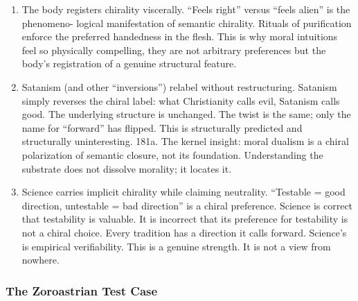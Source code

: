 \documentclass[
]{article}
\begin{document}
\begin{enumerate}
  Moral dualism is powerful but brittle. Freezing the helical flux into
  a fixed battlefield (one twist = good, mirror = evil) is energizing,
  it mobilizes commitment, clarifies choice, and generates heroic
  action. It is also brittle: it cannot accommodate the recognition that
  the mirror-image has its own structural validity. When the mirror is
  encountered (another tradition with opposite chirality), the only
  options are war or denial.
\item
  The body registers chirality viscerally. ``Feels right'' versus
  ``feels alien'' is the phenomeno- logical manifestation of semantic
  chirality. Rituals of purification enforce the preferred handedness in
  the flesh. This is why moral intuitions feel so physically compelling,
  they are not arbitrary preferences but the body's registration of a
  genuine structural feature.
\item
  Satanism (and other ``inversions'') relabel without restructuring.
  Satanism simply reverses the chiral label: what Christianity calls
  evil, Satanism calls good. The underlying structure is unchanged. The
  twist is the same; only the name for ``forward'' has flipped. This is
  structurally predicted and structurally uninteresting. 181a. The
  kernel insight: moral dualism is a chiral polarization of semantic
  closure, not its foundation. Understanding the substrate does not
  dissolve morality; it locates it.
\item
  Science carries implicit chirality while claiming neutrality.
  ``Testable = good direction, untestable = bad direction'' is a chiral
  preference. Science is correct that testability is valuable. It is
  incorrect that its preference for testability is not a chiral choice.
  Every tradition has a direction it calls forward. Science's is
  empirical verifiability. This is a genuine strength. It is not a view
  from nowhere.
\end{enumerate}

\subsubsection{The Zoroastrian Test
Case}\label{the-zoroastrian-test-case}
\end{document}
